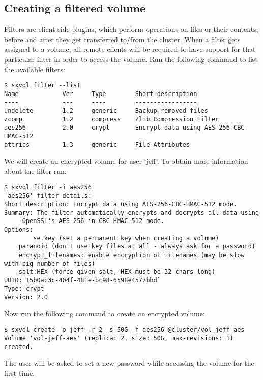 \subsection{Creating a filtered volume}
Filters are client side plugins, which perform operations on files or their contents, before
and after they get transferred to/from the \SX cluster. When a filter gets assigned to a volume,
all remote clients will be required to have support for that particular filter in order to access the volume.
Run the following command to list the available filters:
\begin{lstlisting}
$ sxvol filter --list
Name            Ver     Type        Short description
----            ---     ----        -----------------
undelete        1.2     generic     Backup removed files
zcomp           1.2     compress    Zlib Compression Filter
aes256          2.0     crypt	    Encrypt data using AES-256-CBC-HMAC-512
attribs         1.3     generic     File Attributes
\end{lstlisting}
We will create an encrypted volume for user `jeff'. To obtain more information
about the  filter run:
\begin{lstlisting}
$ sxvol filter -i aes256
'aes256' filter details:
Short description: Encrypt data using AES-256-CBC-HMAC-512 mode.
Summary: The filter automatically encrypts and decrypts all data using
	 OpenSSL's AES-256 in CBC-HMAC-512 mode.
Options: 
        setkey (set a permanent key when creating a volume)
	paranoid (don't use key files at all - always ask for a password)
	encrypt_filenames: enable encryption of filenames (may be slow with big number of files)
	salt:HEX (force given salt, HEX must be 32 chars long)
UUID: 15b0ac3c-404f-481e-bc98-6598e4577bbd`
Type: crypt
Version: 2.0
\end{lstlisting}
Now run the following command to create an encrypted volume:
\begin{lstlisting}
$ sxvol create -o jeff -r 2 -s 50G -f aes256 @cluster/vol-jeff-aes
Volume 'vol-jeff-aes' (replica: 2, size: 50G, max-revisions: 1) created.
\end{lstlisting}
The user will be asked to set a new password while accessing the volume
for the first time.

